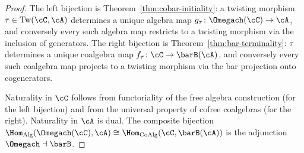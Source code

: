 \begin{proof}
The left bijection is
Theorem~\ref{thm:cobar-initiality}: a twisting morphism
$\tau \in \mathrm{Tw}(\cC, \cA)$ determines a unique algebra map
$g_\tau\colon \Omegach(\cC) \to \cA$, and conversely every such
algebra map restricts to a twisting morphism via the inclusion of
generators. The right bijection is
Theorem~\ref{thm:bar-terminality}: $\tau$ determines a unique
coalgebra map $f_\tau\colon \cC \to \barB(\cA)$, and conversely
every such coalgebra map projects to a twisting morphism via the
bar projection onto cogenerators.

Naturality in $\cC$ follows from functoriality of the free algebra
construction (for the left bijection) and from the universal
property of cofree coalgebras (for the right). Naturality in $\cA$
is dual. The composite bijection
$\Hom_{\mathrm{Alg}}(\Omegach(\cC), \cA)
\cong \Hom_{\mathrm{CoAlg}}(\cC, \barB(\cA))$
is the adjunction $\Omegach \dashv \barB$.
\end{proof}

